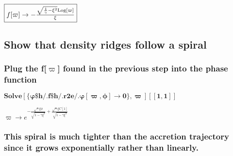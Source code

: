 \documentclass{article}
\begin{document}
\begin{doublespace}
\noindent\(\fbox{$f[\varpi ]\to -\frac{\sqrt{\frac{1}{\gamma }-\xi ^2} \text{Log}[\varpi ]}{\xi }$}\)
\end{doublespace}

\subsection*{Show that density ridges follow a spiral}

\subsubsection*{Plug the f[$\varpi $] found in the previous step into the phase function}

\begin{doublespace}
\noindent\(\pmb{\text{Solve}[\{\text{$\varphi \$$h}\text{/.} \text{f$\$$h} \text{/.} \text{r2e} \text{/.} \varphi [\varpi , \phi ]\to  0 \},\varpi
][[1,1]]}\)
\end{doublespace}

\begin{doublespace}
\noindent\(\varpi \to e^{-\frac{\sqrt{\gamma } \xi  \phi }{\sqrt{1-\gamma  \xi ^2}}+\frac{\sqrt{\gamma } \xi  C[1]}{\sqrt{1-\gamma  \xi ^2}}}\)
\end{doublespace}

\subsubsection*{This spiral is much tighter than the accretion trajectory since it grows exponentially rather than linearly.}
\end{document}
